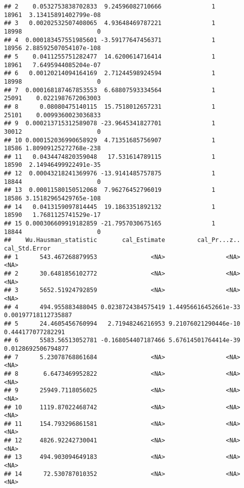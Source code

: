 \documentclass[
]{book}
\begin{document}
\begin{verbatim}
## 2    0.0532753838702833  9.24596082710666              1          18961  3.13415891402799e-08
## 3   0.00202532507408065  4.93648469787221              1          18998                     0
## 4  0.000183457551985601 -3.59177647456371              1          18956 2.88592507054107e-108
## 5    0.0411255751282477  14.6200614716414              1          18961   7.6495944085204e-07
## 6   0.00120214094164169  2.71244598924594              1          18998                     0
## 7  0.000168187467853553  6.68807593334564              1          25091    0.0221987672063003
## 8      0.08080475140115  15.7518012657231              1          25101    0.0099360023036833
## 9  0.000213715312589078 -23.9645341827701              1          30012                     0
## 10 0.000152036990658929  4.71351685756907              1          18586 1.80909125272768e-238
## 11   0.0434474820359048   17.531614789115              1          18590  2.14946499922491e-35
## 12  0.00043218241369976 -13.9141485757875              1          18844                     0
## 13  0.00011580150512068  7.96276452796019              1          18586 3.15182965429765e-108
## 14   0.0413159097814445  19.1863351892132              1          18590   1.7681125741529e-17
## 15 0.000306609919182859 -21.7957030675165              1          18844                     0
##    Wu.Hausman_statistic       cal_Estimate         cal_Pr...z..       cal_Std.Error
## 1      543.467268879953               <NA>                 <NA>                <NA>
## 2      30.6481856102772               <NA>                 <NA>                <NA>
## 3      5652.51924792859               <NA>                 <NA>                <NA>
## 4      494.955883488045 0.0238724384575419 1.44956616452661e-33 0.00197718112735887
## 5      24.4605456760994   2.71948246216953 9.21076021290446e-10   0.444177077282291
## 6      5583.56513052781 -0.168054407187466 5.67614501764414e-39  0.0128692506794877
## 7      5.23078768861684               <NA>                 <NA>                <NA>
## 8       6.6473469952822               <NA>                 <NA>                <NA>
## 9      25949.7118056025               <NA>                 <NA>                <NA>
## 10     1119.87022468742               <NA>                 <NA>                <NA>
## 11     154.793296861581               <NA>                 <NA>                <NA>
## 12     4826.92242730041               <NA>                 <NA>                <NA>
## 13     494.903094649183               <NA>                 <NA>                <NA>
## 14      72.530787010352               <NA>                 <NA>                <NA>

\end{verbatim}
\end{document}
